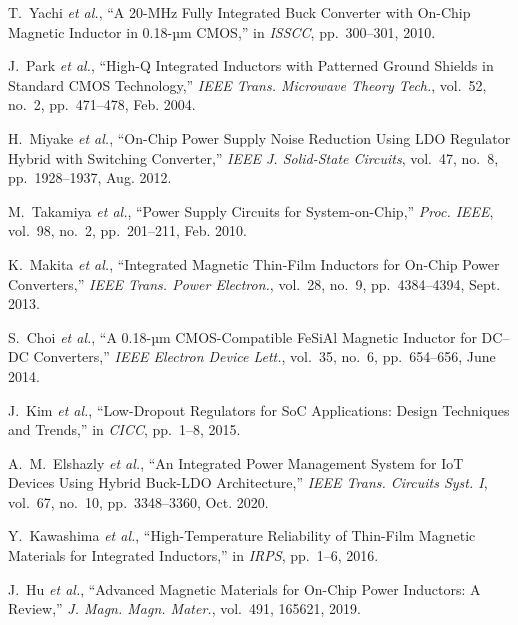 \documentclass[journal]{IEEEtran}
\begin{document}

\begin{thebibliography}{10}

T.~Yachi \emph{et al.}, ``A 20-MHz Fully Integrated Buck Converter with On-Chip Magnetic Inductor in 0.18-µm CMOS,'' in \emph{ISSCC}, pp.~300--301, 2010.

J.~Park \emph{et al.}, ``High-Q Integrated Inductors with Patterned Ground Shields in Standard CMOS Technology,'' \emph{IEEE Trans. Microwave Theory Tech.}, vol.~52, no.~2, pp.~471--478, Feb. 2004.

H.~Miyake \emph{et al.}, ``On-Chip Power Supply Noise Reduction Using LDO Regulator Hybrid with Switching Converter,'' \emph{IEEE J. Solid-State Circuits}, vol.~47, no.~8, pp.~1928--1937, Aug. 2012.

M.~Takamiya \emph{et al.}, ``Power Supply Circuits for System-on-Chip,'' \emph{Proc. IEEE}, vol.~98, no.~2, pp.~201--211, Feb. 2010.

K.~Makita \emph{et al.}, ``Integrated Magnetic Thin-Film Inductors for On-Chip Power Converters,'' \emph{IEEE Trans. Power Electron.}, vol.~28, no.~9, pp.~4384--4394, Sept. 2013.

S.~Choi \emph{et al.}, ``A 0.18-µm CMOS-Compatible FeSiAl Magnetic Inductor for DC--DC Converters,'' \emph{IEEE Electron Device Lett.}, vol.~35, no.~6, pp.~654--656, June 2014.

J.~Kim \emph{et al.}, ``Low-Dropout Regulators for SoC Applications: Design Techniques and Trends,'' in \emph{CICC}, pp.~1--8, 2015.

A.~M.~Elshazly \emph{et al.}, ``An Integrated Power Management System for IoT Devices Using Hybrid Buck-LDO Architecture,'' \emph{IEEE Trans. Circuits Syst. I}, vol.~67, no.~10, pp.~3348--3360, Oct. 2020.

Y.~Kawashima \emph{et al.}, ``High-Temperature Reliability of Thin-Film Magnetic Materials for Integrated Inductors,'' in \emph{IRPS}, pp.~1--6, 2016.

J.~Hu \emph{et al.}, ``Advanced Magnetic Materials for On-Chip Power Inductors: A Review,'' \emph{J. Magn. Magn. Mater.}, vol.~491, 165621, 2019.

\end{thebibliography}
\end{document}
